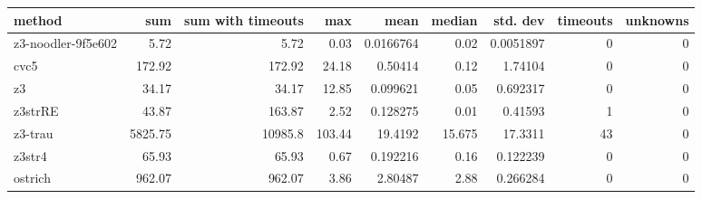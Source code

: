 \begin{tabular}{lrrrrrrrr}
\hline
 method             &     sum &   sum with timeouts &    max &       mean &   median &   std. dev &   timeouts &   unknowns \\
\hline
 z3-noodler-9f5e602 &    5.72 &                5.72 &   0.03 &  0.0166764 &    0.02  &  0.0051897 &          0 &          0 \\
 cvc5               &  172.92 &              172.92 &  24.18 &  0.50414   &    0.12  &  1.74104   &          0 &          0 \\
 z3                 &   34.17 &               34.17 &  12.85 &  0.099621  &    0.05  &  0.692317  &          0 &          0 \\
 z3strRE            &   43.87 &              163.87 &   2.52 &  0.128275  &    0.01  &  0.41593   &          1 &          0 \\
 z3-trau            & 5825.75 &            10985.8  & 103.44 & 19.4192    &   15.675 & 17.3311    &         43 &          0 \\
 z3str4             &   65.93 &               65.93 &   0.67 &  0.192216  &    0.16  &  0.122239  &          0 &          0 \\
 ostrich            &  962.07 &              962.07 &   3.86 &  2.80487   &    2.88  &  0.266284  &          0 &          0 \\
\hline
\end{tabular}
